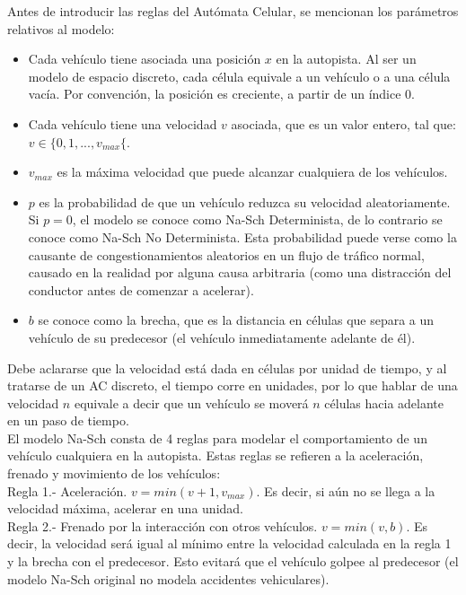 Antes de introducir las reglas del Autómata Celular, se mencionan los parámetros relativos al modelo:
\begin{itemize}
\item Cada vehículo tiene asociada una posición $x$ en la autopista. Al ser un modelo de espacio discreto, cada célula equivale a un vehículo o a una célula vacía. Por convención, la posición es creciente, a partir de un índice 0.
\item  Cada vehículo tiene una velocidad $v$ asociada, que es un valor entero, tal que: $v \in \lbrace 0,1,...,v_{max} \lbrace$.
\item $v_{max}$ es la máxima velocidad que puede alcanzar cualquiera de los vehículos.
\item $p$ es la probabilidad de que un vehículo reduzca su velocidad aleatoriamente. Si $p=0$, el modelo se conoce como Na-Sch Determinista, de lo contrario se conoce como Na-Sch No Determinista. Esta probabilidad puede verse como la causante de congestionamientos aleatorios en un flujo de tráfico normal, causado en la realidad por alguna causa arbitraria (como una distracción del conductor antes de comenzar a acelerar).
\item  $b$ se conoce como la brecha, que es la distancia en células que separa a un vehículo de su predecesor (el vehículo inmediatamente adelante de él).
\end{itemize}

Debe aclararse que la velocidad está dada en células por unidad de tiempo, y al tratarse de un AC discreto, el tiempo corre en unidades, por lo que hablar de una velocidad $n$ equivale a decir que un vehículo se moverá $n$ células hacia adelante en un paso de tiempo.\\

El modelo Na-Sch consta de 4 reglas para modelar el comportamiento de un vehículo cualquiera en la autopista. Estas reglas se refieren a la aceleración, frenado y movimiento de los vehículos:\\


Regla 1.- Aceleración. $ v=min(v+1,v_{max})$. Es decir, si aún no se llega a la velocidad máxima, acelerar en una unidad.\\

Regla 2.- Frenado por la interacción con otros vehículos. $v=min(v,b)$. Es decir, la velocidad será igual al mínimo entre la velocidad calculada en la regla 1 y la brecha con el predecesor. Esto evitará que el vehículo golpee al predecesor (el modelo Na-Sch original no modela accidentes vehiculares).\\

